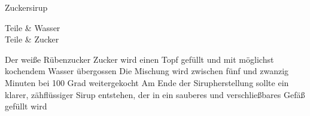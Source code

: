 \begin{recipe}
	[
	preparationtime = {\unit[25]{min}},
	bakingtime,
	bakingtemperature,
	portion = {\portion{1}},
	calory,
	source
	]
	{Zuckersirup}
	
	\graph
	{
	}
	
	\ingredients
	{
		\unit[2]{Teile} & Wasser \\
		\unit[3]{Teile} & Zucker
	}
	
	\preparation
	{
		\step Der weiße Rübenzucker Zucker wird einen Topf gefüllt und mit möglichst kochendem Wasser übergossen
		\step Die Mischung wird zwischen fünf und zwanzig Minuten bei 100 Grad weitergekocht
		\step Am Ende der Sirupherstellung sollte ein klarer, zähflüssiger Sirup entstehen, der in ein sauberes und verschließbares Gefäß gefüllt wird
	}
	
\end{recipe}